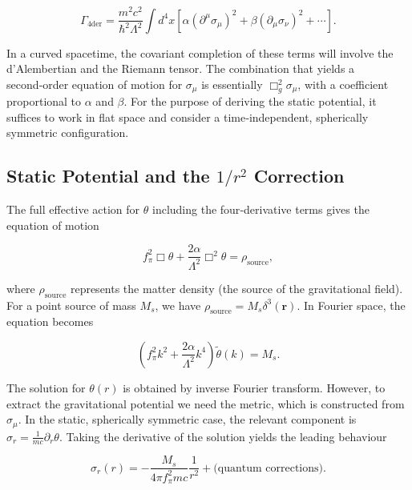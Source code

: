 \documentclass[11pt,a4paper]{article}
\begin{document}
\begin{equation}
\Gamma_{\text{4der}} = \frac{m^2c^2}{\hbar^2\Lambda^2} \int d^4x \left[ \alpha (\partial^\mu\sigma_\mu)^2 + \beta (\partial_\mu\sigma_\nu)^2 + \cdots \right]. \label{eq:4der}
\end{equation}

In a curved spacetime, the covariant completion of these terms will involve the d'Alembertian and the Riemann tensor. The combination that yields a second‑order equation of motion for \(\sigma_\mu\) is essentially \(\Box_g^2 \sigma_\mu\), with a coefficient proportional to \(\alpha\) and \(\beta\). For the purpose of deriving the static potential, it suffices to work in flat space and consider a time‑independent, spherically symmetric configuration.

\subsection{Static Potential and the \(1/r^2\) Correction}

The full effective action for \(\theta\) including the four‑derivative terms gives the equation of motion

\begin{equation}
f_\pi^2 \Box \theta + \frac{2\alpha}{\Lambda^2} \Box^2 \theta = \rho_{\text{source}},
\end{equation}

where \(\rho_{\text{source}}\) represents the matter density (the source of the gravitational field). For a point source of mass \(M_s\), we have \(\rho_{\text{source}} = M_s \delta^3(\mathbf{r})\). In Fourier space, the equation becomes

\begin{equation}
\left( f_\pi^2 k^2 + \frac{2\alpha}{\Lambda^2} k^4 \right) \tilde{\theta}(k) = M_s.
\end{equation}

The solution for \(\theta(r)\) is obtained by inverse Fourier transform. However, to extract the gravitational potential we need the metric, which is constructed from \(\sigma_\mu\). In the static, spherically symmetric case, the relevant component is \(\sigma_r = \frac{1}{mc}\partial_r\theta\). Taking the derivative of the solution yields the leading behaviour

\begin{equation}
\sigma_r(r) = -\frac{M_s}{4\pi f_\pi^2 mc} \frac{1}{r^2} + \text{(quantum corrections)}.
\end{equation}
\end{document}
